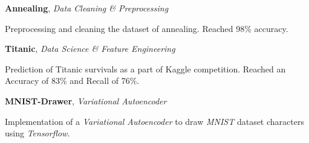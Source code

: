 \documentclass[margin, 10pt]{res} %
\begin{document}
\textbf{Annealing}, 
\textit{Data Cleaning \& Preprocessing}
\begin{innerlist}
	\item Preprocessing and cleaning the dataset of annealing. Reached 98\% accuracy.\\ \phantom{km}
	\hfill{}
\end{innerlist}

\textbf{Titanic}, 
\textit{Data Science \& Feature Engineering}
\begin{innerlist}
	\item Prediction of Titanic survivals as a part of Kaggle competition. Reached an Accuracy of 83\% and Recall of 76\%. \href{https://github.com/aligholamee/Titanic}{\hfill{\UrlFont[code]}}
\end{innerlist}

\textbf{MNIST-Drawer}, 
\textit{Variational Autoencoder}
\begin{innerlist}
	\item Implementation of a \textit{Variational Autoencoder} to draw \textit{MNIST} dataset characters using \textit{Tensorflow}. \href{https://github.com/aligholamee/MNIST-Drawer}{\hfill{\UrlFont[code]}}
\end{innerlist}
\end{document}
